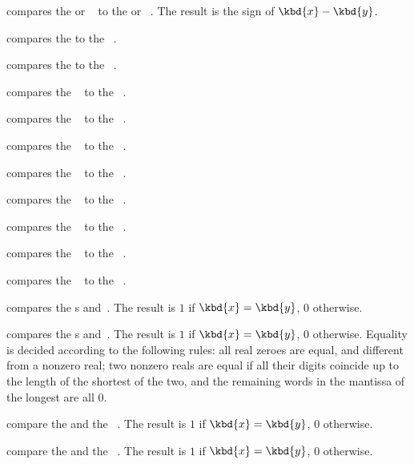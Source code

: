 \smallskip

 compares the  or ~
to the  or ~. The result is the sign of
$\kbd{x}-\kbd{y}$.

 compares the   to the
~.

 compares the   to the
~.

 compares the ~ to the
~.

 compares the ~ to the
~.

 compares the ~ to the
~.

 compares the ~ to the
~.

 compares the ~ to the
~.

 compares the ~ to the
~.

 compares the ~ to the
~.

 compares the ~ to the
~.

 compares the s  and~.
The result is $1$ if $\kbd{x} = \kbd{y}$, $0$ otherwise.

 compares the s  and~.
The result is $1$ if $\kbd{x} = \kbd{y}$, $0$ otherwise. Equality is decided
according to the following rules: all real zeroes are equal, and
different from a nonzero real; two nonzero reals are equal if all their
digits coincide up to the length of the shortest of the two, and the
remaining words in the mantissa of the longest are all $0$.

 compare the   and
the ~. The result is $1$ if $\kbd{x} = \kbd{y}$, $0$ otherwise.


 compare the   and
the ~. The result is $1$ if $\kbd{x} = \kbd{y}$, $0$
otherwise.

